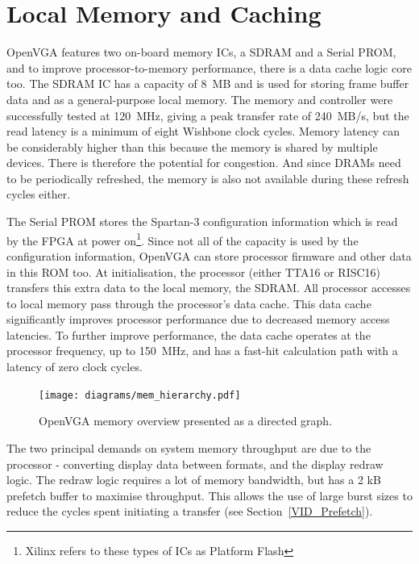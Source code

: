 \chapter{Local Memory and Caching}
\label{MEM}

OpenVGA features two on-board memory ICs, a SDRAM and a Serial PROM, and to
improve processor-to-memory performance, there is a data cache logic core too.
The SDRAM IC has a capacity of 8~MB and is used for storing frame buffer data and
as a general-purpose local memory. The memory and controller were successfully
tested at 120~MHz, giving a peak transfer rate of 240~MB/s, but the read latency
is a minimum of eight Wishbone clock cycles. Memory latency can be considerably
higher than this because the memory is shared by multiple devices. There is
therefore the potential for congestion. And since DRAMs need to be periodically
refreshed, the memory is also not available during these refresh cycles either.

The Serial PROM stores the Spartan-3 configuration information which is read by
the FPGA at power on\footnote{Xilinx refers to these types of ICs as Platform
Flash}. Since not all of the capacity is used by the configuration information,
OpenVGA can store processor firmware and other data in this ROM too. At
initialisation, the processor (either TTA16 or RISC16) transfers this extra data
to the local memory, the SDRAM. All processor accesses to local memory pass
through the processor's data cache. This data cache significantly improves
processor performance due to decreased memory access latencies. To further
improve performance, the data cache operates at the processor frequency, up to
150~MHz, and has a fast-hit calculation path with a latency of zero clock cycles.

\begin{figure}[h!]
\begin{center}
\texttt{[image: diagrams/mem\_hierarchy.pdf]}
\caption[OpenVGA memory hierarchy]{OpenVGA memory overview presented as a
directed graph.}
\end{center}
\end{figure}

The two principal demands on system memory throughput are due to the processor -
converting display data between formats, and the display redraw logic. The redraw
logic requires a lot of memory bandwidth, but has a 2 kB prefetch buffer to
maximise throughput. This allows the use of large burst sizes to reduce the
cycles spent initiating a transfer (see Section~\ref{VID_Prefetch}).

